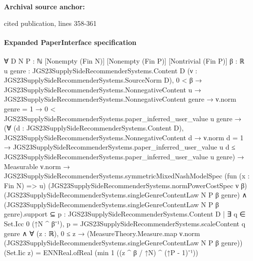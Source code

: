 \documentclass[10pt]{article}
\begin{document}
\textbf{Archival source anchor:} {\footnotesize\raggedright cited publication, lines 358-\allowbreak{}361\par}
\paragraph{Expanded PaperInterface specification}
\begin{ReviewVerbatim}
∀ {D N P : ℕ} [Nonempty (Fin N)] [Nonempty (Fin P)] [Nontrivial (Fin P)] {β : ℝ}
  {u genre : JGS23SupplySideRecommenderSystems.Content D} (ν : JGS23SupplySideRecommenderSystems.SourceNorm D),
  0 < β →
    JGS23SupplySideRecommenderSystems.NonnegativeContent u →
      JGS23SupplySideRecommenderSystems.NonnegativeContent genre →
        ν.norm genre = 1 →
          0 < JGS23SupplySideRecommenderSystems.paper_inferred_user_value u genre →
            (∀ (d : JGS23SupplySideRecommenderSystems.Content D),
                JGS23SupplySideRecommenderSystems.NonnegativeContent d →
                  ν.norm d = 1 →
                    JGS23SupplySideRecommenderSystems.paper_inferred_user_value u d ≤
                      JGS23SupplySideRecommenderSystems.paper_inferred_user_value u genre) →
              Measurable ν.norm →
                JGS23SupplySideRecommenderSystems.symmetricMixedNashModelSpec (fun (x : Fin N) => u)
                    (JGS23SupplySideRecommenderSystems.normPowerCostSpec ν β)
                    (JGS23SupplySideRecommenderSystems.singleGenreContentLaw N P β genre) ∧
                  (JGS23SupplySideRecommenderSystems.singleGenreContentLaw N P β genre).support ⊆
                      {p : JGS23SupplySideRecommenderSystems.Content D |
                        ∃ q ∈ Set.Icc 0 (↑N ^ β⁻¹), p = JGS23SupplySideRecommenderSystems.scaleContent q genre} ∧
                    ∀ (z : ℝ),
                      0 ≤ z →
                        (MeasureTheory.Measure.map ν.norm
                              (JGS23SupplySideRecommenderSystems.singleGenreContentLaw N P β genre))
                            (Set.Iic z) =
                          ENNReal.ofReal (min 1 ((z ^ β / ↑N) ^ (↑P - 1)⁻¹))
\end{ReviewVerbatim}
\end{document}
